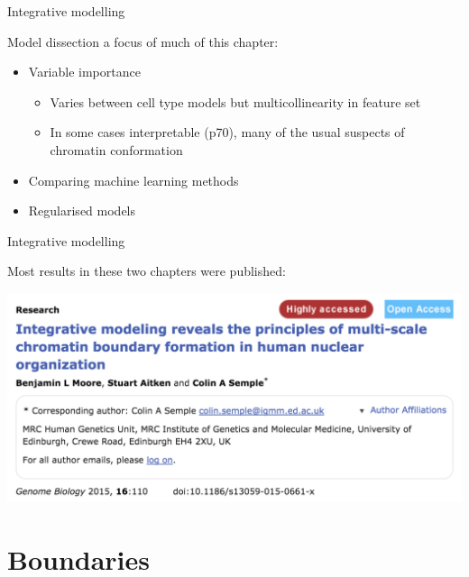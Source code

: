 \documentclass{beamer}
\begin{document}
\begin{frame}{Integrative modelling}

Model dissection a focus of much of this chapter: \\

\vspace{2em}

\begin{itemize}
\item Variable importance
\begin{itemize}
\item Varies between cell type models but multicollinearity in feature set
\item In some cases interpretable (p70), many of the usual suspects of chromatin conformation
\end{itemize}
\item Comparing machine learning methods
\item Regularised models
\end{itemize}

\vspace{1em}

\end{frame}

\begin{frame}{Integrative modelling}

Most results in these two chapters were published:

\vspace{2em}
\centering
\includegraphics[width=.9\textwidth]{../figs/paper_screenshot.png}
\vspace{2em}

\end{frame}

\section{Boundaries}
\end{document}
